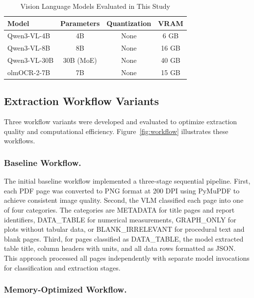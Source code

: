 \documentclass{svproc}
\begin{document}
\begin{table}[htbp]
\caption{Vision Language Models Evaluated in This Study}
\label{tab:models}
\begin{center}
\small
\begin{tabular}{lccc}
\toprule
\textbf{Model} & \textbf{Parameters} & \textbf{Quantization} & \textbf{VRAM} \\
\midrule
Qwen3-VL-4B & 4B & None & 6 GB \\
Qwen3-VL-8B & 8B & None & 16 GB \\
Qwen3-VL-30B & 30B (MoE) & None & 40 GB \\
olmOCR-2-7B & 7B & None & 15 GB \\
\bottomrule
\end{tabular}
\end{center}
\end{table}

\subsection{Extraction Workflow Variants}

Three workflow variants were developed and evaluated to optimize extraction quality and computational efficiency. Figure~\ref{fig:workflow} illustrates these workflows.

\subsubsection{Baseline Workflow.}

The initial baseline workflow implemented a three-stage sequential pipeline. First, each PDF page was converted to PNG format at 200 DPI using PyMuPDF to achieve consistent image quality. Second, the VLM classified each page into one of four categories. The categories are METADATA for title pages and report identifiers, DATA\_TABLE for numerical measurements, GRAPH\_ONLY for plots without tabular data, or BLANK\_IRRELEVANT for procedural text and blank pages. Third, for pages classified as DATA\_TABLE, the model extracted table title, column headers with units, and all data rows formatted as JSON. This approach processed all pages independently with separate model invocations for classification and extraction stages.

\subsubsection{Memory-Optimized Workflow.}
\end{document}
